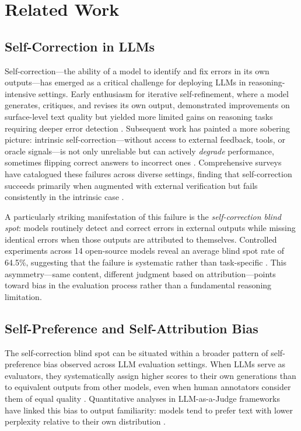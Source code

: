 \documentclass[11pt]{article}
\begin{document}
\section{Related Work}
\label{sec:related}

\subsection{Self-Correction in LLMs}

Self-correction---the ability of a model to identify and fix errors in its own outputs---has emerged as a critical challenge for deploying LLMs in reasoning-intensive settings. Early enthusiasm for iterative self-refinement, where a model generates, critiques, and revises its own output, demonstrated improvements on surface-level text quality but yielded more limited gains on reasoning tasks requiring deeper error detection \citep{madaan2023selfrefine}. Subsequent work has painted a more sobering picture: intrinsic self-correction---without access to external feedback, tools, or oracle signals---is not only unreliable but can actively \emph{degrade} performance, sometimes flipping correct answers to incorrect ones \citep{huang2024selfcorrection}. Comprehensive surveys have catalogued these failures across diverse settings, finding that self-correction succeeds primarily when augmented with external verification but fails consistently in the intrinsic case \citep{kamoi2024selfcorrection}.

A particularly striking manifestation of this failure is the \emph{self-correction blind spot}: models routinely detect and correct errors in external outputs while missing identical errors when those outputs are attributed to themselves. Controlled experiments across 14 open-source models reveal an average blind spot rate of 64.5\%, suggesting that the failure is systematic rather than task-specific \citep{tsui2025blindspot}. This asymmetry---same content, different judgment based on attribution---points toward bias in the evaluation process rather than a fundamental reasoning limitation.

\subsection{Self-Preference and Self-Attribution Bias}

The self-correction blind spot can be situated within a broader pattern of self-preference bias observed across LLM evaluation settings. When LLMs serve as evaluators, they systematically assign higher scores to their own generations than to equivalent outputs from other models, even when human annotators consider them of equal quality \citep{panickssery2024selfpreference}. Quantitative analyses in LLM-as-a-Judge frameworks have linked this bias to output familiarity: models tend to prefer text with lower perplexity relative to their own distribution \citep{wataoka2024selfpreference}.
\end{document}
